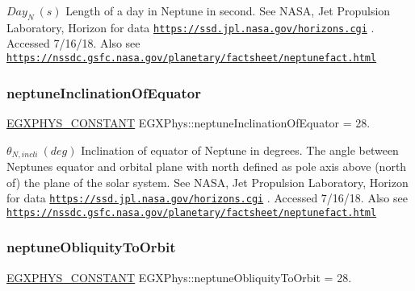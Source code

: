 $ Day_{N} \ (s)$ Length of a day in Neptune in second. See N\+A\+SA, Jet Propulsion Laboratory, Horizon for data \href{https://ssd.jpl.nasa.gov/horizons.cgi}{\tt https\+://ssd.\+jpl.\+nasa.\+gov/horizons.\+cgi} . Accessed 7/16/18. Also see \href{https://nssdc.gsfc.nasa.gov/planetary/factsheet/neptunefact.html}{\tt https\+://nssdc.\+gsfc.\+nasa.\+gov/planetary/factsheet/neptunefact.\+html} \mbox{\label{group___e_g_x_phys-_constants-_astrophysics-_solar_system-_neptune-_orbit_ga4b3976f0046f85f1c24cc816d9a6995f}} 
\subsubsection{\texorpdfstring{neptune\+Inclination\+Of\+Equator}{neptuneInclinationOfEquator}}
{\footnotesize\ttfamily \mbox{\hyperlink{group___e_g_x_phys-_constants-_macros_ga76980d288494ce1714c9ac68a95ba702}{E\+G\+X\+P\+H\+Y\+S\+\_\+\+C\+O\+N\+S\+T\+A\+NT}} E\+G\+X\+Phys\+::neptune\+Inclination\+Of\+Equator = 28.}

$ \theta_{N,incli} \ (deg)$ Inclination of equator of Neptune in degrees. The angle between Neptune\textquotesingle{}s equator and orbital plane with north defined as pole axis above (north of) the plane of the solar system. See N\+A\+SA, Jet Propulsion Laboratory, Horizon for data \href{https://ssd.jpl.nasa.gov/horizons.cgi}{\tt https\+://ssd.\+jpl.\+nasa.\+gov/horizons.\+cgi} . Accessed 7/16/18. Also see \href{https://nssdc.gsfc.nasa.gov/planetary/factsheet/neptunefact.html}{\tt https\+://nssdc.\+gsfc.\+nasa.\+gov/planetary/factsheet/neptunefact.\+html} \mbox{\label{group___e_g_x_phys-_constants-_astrophysics-_solar_system-_neptune-_orbit_ga1971d8fca696f1653c84aa7f20e48c42}} 
\subsubsection{\texorpdfstring{neptune\+Obliquity\+To\+Orbit}{neptuneObliquityToOrbit}}
{\footnotesize\ttfamily \mbox{\hyperlink{group___e_g_x_phys-_constants-_macros_ga76980d288494ce1714c9ac68a95ba702}{E\+G\+X\+P\+H\+Y\+S\+\_\+\+C\+O\+N\+S\+T\+A\+NT}} E\+G\+X\+Phys\+::neptune\+Obliquity\+To\+Orbit = 28.}

